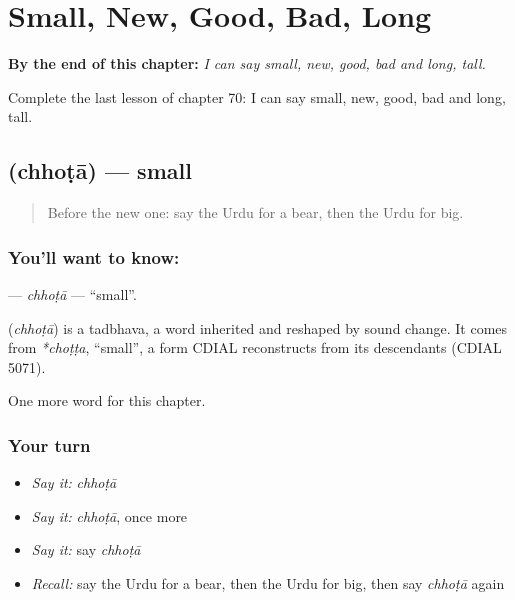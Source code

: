 
\chapter{Small, New, Good, Bad, Long}
\label{ch:ur-small-new-good-bad-long}

\begin{chapteropening}
\textbf{By the end of this chapter:} \emph{I can say small, new, good, bad and long, tall.}

Complete the last lesson of chapter 70: I can say small, new, good, bad and long, tall.
\end{chapteropening}

\section[\texorpdfstring{\ur{چھوٹا} (chhoṭā)}{چھوٹا (chhoṭā)}]{ (chhoṭā) — small}

\label{lesson:UR-C70-chhota}



\begin{quote}
Before the new one: say the Urdu for a bear, then the Urdu for big.
\end{quote}

\subsection*{You'll want to know: }
\textbf{} — \emph{chhoṭā} — \textquotedblleft{}small\textquotedblright{}.

\begin{cousinweb}
\textbf{} (\emph{chhoṭā}) is a tadbhava, a word inherited and reshaped by sound change. It comes from \emph{*choṭṭa}, \textquotedblleft{}small\textquotedblright{}, a form CDIAL reconstructs from its descendants (CDIAL 5071).
\end{cousinweb}

\begin{grammarlens}[title={What you've built}]
One more word for this chapter.
\end{grammarlens}

\subsection*{Your turn}
\begin{itemize}
\raggedright
  \item \emph{Say it:} \emph{chhoṭā}
  \item \emph{Say it:} \emph{chhoṭā}, once more
  \item \emph{Say it:} say \emph{chhoṭā}
  \item \emph{Recall:} say the Urdu for a bear, then the Urdu for big, then say \emph{chhoṭā} again
\end{itemize}

